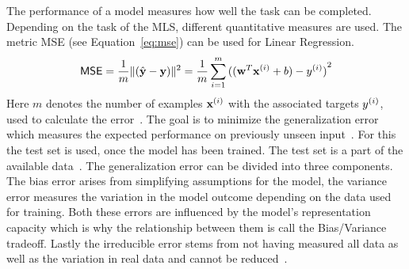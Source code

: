 The performance of a model measures how well the task can be completed.
Depending on the task of the \ac{MLS}, different quantitative measures are used.
The metric \ac{MSE} (see Equation~\ref{eq:mse}) can be used for Linear Regression.
\begin{equation}\label{eq:mse}
    \textsf{MSE} =\frac{1}{m}\lVert{(\hat{\textbf{y}} - \textbf{y})}\rVert^2
        =\frac{1}{m}\sum_{i=1}^m {((\textbf{w}^T \textbf{x}^{(i)} + b) - y^{(i)})}^2
\end{equation}
Here $m$ denotes the number of examples $\textbf{x}^{(i)}$ with the associated targets $y^{(i)}$, used to calculate
the error~\citep{geron_hands-machine_2017,goodfellow_deep_2016}.
The goal is to minimize the generalization error which measures the expected performance on
previously unseen input~\citep{geron_hands-machine_2017}.
For this the test set is used, once the model has been trained.
The test set is a part of the available data~\citep{geron_hands-machine_2017, goodfellow_deep_2016}.
The generalization error can be divided into three components.
The bias error arises from simplifying assumptions for the model, the variance error measures the
variation in the model outcome depending on the data used for training.
Both these errors are influenced by the model's representation capacity which is why the
relationship between them is call the Bias/Variance tradeoff.
Lastly the irreducible error stems from not having measured all data as well as the variation
in real data and cannot be
reduced~\citep{ashmore_assuring_2021, james_introduction_2013,geron_hands-machine_2017}.

